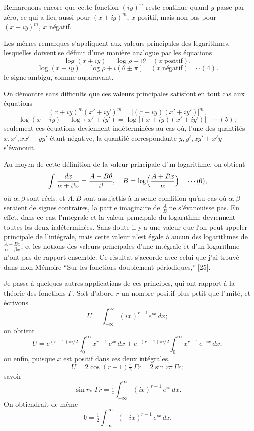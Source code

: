 \documentclass[12pt,a4paper]{article}
\begin{document}
Remarquons encore que cette fonction $(iy)^m$ reste continue quand $y$ passe par z\'ero, ce qui a lieu aussi pour $(x + iy)^m$, $x$ positif, mais non pas pour $(x + iy)^m$, $x$ n\'egatif.

Les m\^emes remarques s'appliquent aux valeurs principales des logarithmes, lesquelles doivent se d\'efinir d'une mani\`ere analogue par les \'equations
\[
\log(x + iy) = \log\rho + i\theta\quad (x\ \text{positif}),
\]
\[
\log(x + iy) = \log\rho + i(\theta \pm \pi)\quad (x\ \text{n\'egatif})\quad\cdots(4).
\]
le signe ambigu, comme auparavant.

On d\'emontre sans difficult\'e que ces valeurs principales satisfont en tout cas aux \'equations
\[
(x + iy)^m (x' + iy')^m = \bigl[(x + iy)(x' + iy')\bigr]^m,
\]
\[
\log(x + iy) + \log(x' + iy') = \log\bigl[(x + iy)(x' + iy')\bigr]\quad\cdots(5);
\]
seulement ces \'equations deviennent ind\'etermin\'ees au cas o\`u, l'une des quantit\'es $x, x', xx' - yy'$ \'etant n\'egative, la quantit\'e correspondante $y, y', xy' + x'y$ s'\'evanouit.

Au moyen de cette d\'efinition de la valeur principale d'un logarithme, on obtient
\[
\int\,\frac{dx}{\alpha + \beta x} = \frac{A + B\theta}{\beta},\quad B = \log\Bigl(\frac{A + Bx}{\alpha}\Bigr) \quad\cdots(6),
\]
o\`u $\alpha, \beta$ sont r\'eels, et $A, B$ sont assujettis \`a la seule condition qu'au cas o\`u $\alpha, \beta$ seraient de signes contraires, la partie imaginaire de $\tfrac{A}{B}$ ne s'\'evanouisse pas. En effet, dans ce cas, l'int\'egrale et la valeur principale du logarithme deviennent toutes les deux ind\'etermin\'ees. Sans doute il y a une valeur que l'on peut appeler principale de l'int\'egrale, mais cette valeur n'est \'egale \`a aucun des logarithmes de $\tfrac{A + Bx}{\alpha + \beta x}$, et les notions des valeurs principales d'une int\'egrale et d'un logarithme n'ont pas de rapport ensemble. Ce r\'esultat s'accorde avec celui que j'ai trouv\'e dans mon M\'emoire ``Sur les fonctions doublement p\'eriodiques,'' [25].

Je passe \`a quelques autres applications de ces principes, qui ont rapport \`a la th\'eorie des fonctions $\Gamma$. Soit d'abord $r$ un nombre positif plus petit que l'unit\'e, et \'ecrivons
\[
U = \int_{-\infty}^{\infty}(ix)^{r-1} e^{ix}\,dx;
\]
on obtient
\[
U = e^{(r-1)\pi i/2}\int_0^\infty x^{r-1}\,e^{ix}\,dx + e^{-(r-1)\pi i/2}\int_0^\infty x^{r-1}\,e^{-ix}\,dx;
\]
ou enfin, puisque $x$ est positif dans ces deux int\'egrales,
\[
U = 2\cos(r - 1)\tfrac{\pi}{2}\,\Gamma r = 2\sin r\pi\,\Gamma r;
\]
savoir
\[
\sin r\pi\,\Gamma r = \tfrac12\int_{-\infty}^{\infty}(ix)^{r-1}\,e^{ix}\,dx.
\]
On obtiendrait de m\^eme
\[
0 = \tfrac12\int_{-\infty}^{\infty}(-ix)^{r-1}\,e^{ix}\,dx.
\]
\end{document}
